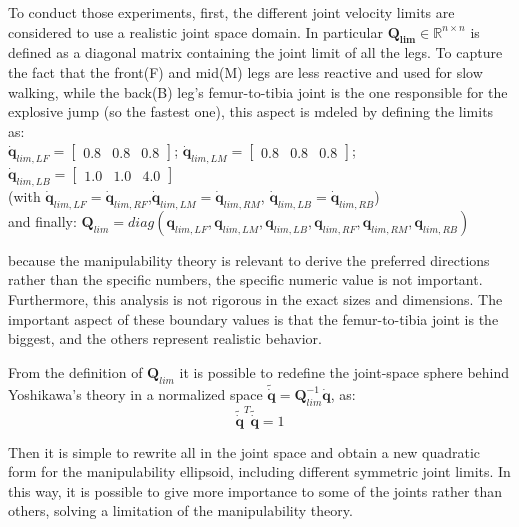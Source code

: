 To conduct those experiments, first, the different joint velocity limits are considered to use a realistic joint space domain. In particular $\mathbf{Q_{lim}}\in\mathbb{R}^{n\times n}$ is defined \cite{DualArmSpaceManipulabilityEllipsoid}as a diagonal matrix containing the joint limit of all the legs. 
To capture the fact that the front(F) and mid(M) legs are less reactive and used for slow walking, while the back(B) leg's femur-to-tibia joint is the one responsible for the explosive jump (so the fastest one), this aspect is mdeled by defining the limits as:\\
$\mathbf{\dot{q}}_{lim,LF} = \begin{bmatrix}
    0.8 & 0.8 & 0.8
\end{bmatrix}$; 
$\mathbf{\dot{q}}_{lim,LM} = \begin{bmatrix}
    0.8 & 0.8 & 0.8
\end{bmatrix}$; 
$\mathbf{\dot{q}}_{lim,LB} =  \begin{bmatrix}
    1.0 & 1.0 & 4.0
\end{bmatrix}$\\
(with $\mathbf{\dot{q}}_{lim,LF} = \mathbf{\dot{q}}_{lim,RF}$,$\mathbf{\dot{q}}_{lim,LM} = \mathbf{\dot{q}}_{lim,RM}$, $\mathbf{\dot{q}}_{lim,LB} = \mathbf{\dot{q}}_{lim,RB}$)\\

and finally:
$\mathbf{Q}_{lim} = diag(\mathbf{q}_{lim,LF}, \mathbf{q}_{lim,LM}, \mathbf{q}_{lim,LB}, \mathbf{q}_{lim,RF}, \mathbf{q}_{lim,RM}, \mathbf{q}_{lim,RB})$


 because the manipulability theory is relevant to derive the preferred directions rather than the specific numbers\cite{LimitsEllipsoid}, the specific numeric value is not important. Furthermore, this analysis is not rigorous in the exact sizes and dimensions. The important aspect of these boundary values is that the femur-to-tibia joint is the biggest, and the others represent realistic behavior. 

From the definition of $\mathbf{Q}_{lim}$ it is possible to redefine the joint-space sphere behind Yoshikawa's theory in a normalized space $\mathbf{\tilde{\dot{q}}} = \mathbf{Q}^{-1}_{lim}\mathbf{\dot{q}}$, as:
\begin{equation} \mathbf{\tilde{\dot{q}}}^T\mathbf{\tilde{\dot{q}}} = 1
    \label{eq:nornalized_space}
\end{equation}

Then it is simple to rewrite all in the joint space and obtain a new quadratic form for the manipulability ellipsoid, including different symmetric joint limits. In this way, it is possible to give more importance to some of the joints rather than others, solving a limitation of the manipulability theory.  

